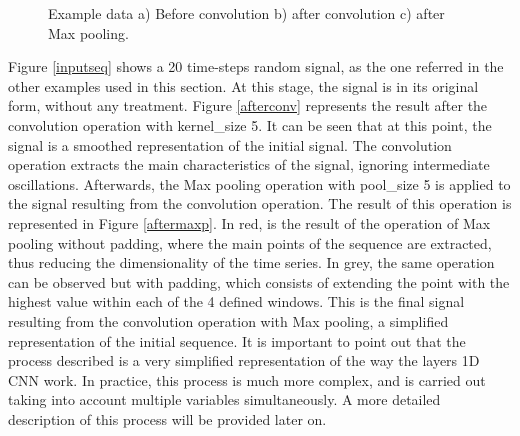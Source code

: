 \begin{figure}[h!]
\captionsetup[subfigure]{position=b}
\centering
{}
\caption{Example data a) Before convolution b) after convolution c) after Max pooling.}
\label{resdata}
\end{figure}


Figure \ref{inputseq} shows a 20 time-steps random signal, as the one referred in the other examples used in this section. At this stage, the signal is in its original form, without any treatment. Figure \ref{afterconv} represents the result after the convolution operation with kernel\_size 5. It can be seen that at this point, the signal is a smoothed representation of the initial signal. The convolution operation extracts the main characteristics of the signal, ignoring intermediate oscillations. Afterwards, the Max pooling operation with pool\_size 5 is applied to the signal resulting from the convolution operation. The result of this operation is represented in Figure \ref{aftermaxp}. In red, is the result of the operation of Max pooling without padding, where the main points of the sequence are extracted, thus reducing the dimensionality of the time series. In grey, the same operation can be observed but with padding,  which consists of extending the point with the highest value within each of the 4 defined windows. This is the final signal resulting from the convolution operation with Max pooling, a simplified representation of the initial sequence. It is important to point out that the process described is a very simplified representation of the way the layers \ac{1D CNN} work. In practice, this process is much more complex, and is carried out taking into account multiple variables simultaneously. A more detailed description of this process will be provided later on. 

